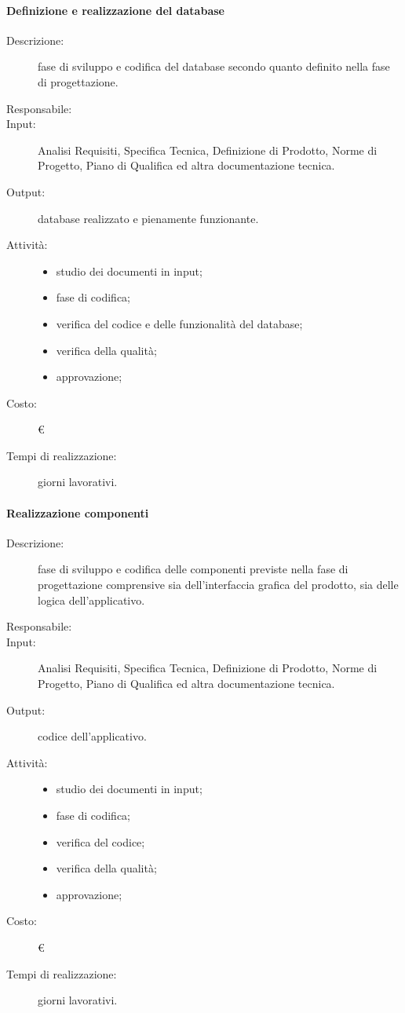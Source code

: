 \paragraph{Definizione e realizzazione del database}
\begin{description}
\item[Descrizione:] fase di sviluppo e codifica del database secondo quanto definito nella fase di progettazione.
\item[Responsabile:] 
\item[Input:] Analisi Requisiti, Specifica Tecnica, Definizione di Prodotto, Norme di Progetto, Piano di Qualifica ed altra documentazione tecnica.
\item[Output:]database realizzato e pienamente funzionante.
\item[Attività:]
\begin{itemize}
\item studio dei documenti in input;
\item fase di codifica;
\item verifica del codice e delle funzionalità del database;
\item verifica della qualità;
\item approvazione;
\end{itemize}
\item[Costo:] \euro{}
\item[Tempi di realizzazione:]  giorni lavorativi.
\end{description}

\paragraph{Realizzazione componenti}
\begin{description}
\item[Descrizione:] fase di sviluppo e codifica delle componenti previste nella fase di progettazione comprensive sia dell'interfaccia grafica del prodotto, sia delle logica dell'applicativo.
\item[Responsabile:] 
\item[Input:] Analisi Requisiti, Specifica Tecnica, Definizione di Prodotto, Norme di Progetto, Piano di Qualifica ed altra documentazione tecnica.
\item[Output:] codice dell'applicativo.
\item[Attività:]
\begin{itemize}
\item studio dei documenti in input;
\item fase di codifica;
\item verifica del codice;
\item verifica della qualità;
\item approvazione;
\end{itemize}
\item[Costo:] \euro{}
\item[Tempi di realizzazione:]  giorni lavorativi.
\end{description}

